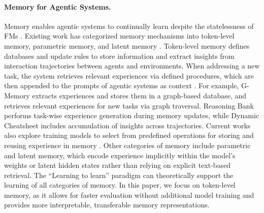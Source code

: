 \documentclass{article}
\theoremstyle{plain}
\theoremstyle{definition}
\theoremstyle{remark}
\newif\ifcomment
\newcommand{\shc}[1]{\textcolor{violet}{\ifcomment(SH Comment: #1)\else#1\fi}}
\begin{document}
\paragraph{Memory for Agentic Systems.} Memory enables agentic systems to continually learn despite the statelessness of FMs \citep{hu2025memory, Zhang2025Survey}. Existing work has categorized memory mechanisms into token-level memory, parametric memory, and latent memory \citep{hu2025memory}. Token-level memory defines databases and update rules to store information and extract insights from interaction trajectories between agents and environments. When addressing a new task, the system retrieves relevant experiences via defined procedures, which are then appended to the prompts of agentic systems as context \citep{chhikara2025mem0, rasmussen2025zep, nan2025nemori, zhang2025g, ouyang2025reasoningbank, suzgun2025DynamicCheatsheet, zhaoExpeL2024}. For example, G-Memory \citep{zhang2025g} extracts experiences and stores them in a graph-based database, and retrieves relevant experiences for new tasks via graph traversal. Reasoning Bank \citep{ouyang2025reasoningbank} performs task-wise experience generation during memory updates, while Dynamic Cheatsheet \citep{suzgun2025DynamicCheatsheet} includes accumulation of insights across trajectories. Current works also explore training models to select from predefined operations for storing and reusing experience in memory \citep{zhou2025memento, yan2025memory, liang2026learning, wang2025mem}. Other categories of memory include parametric and latent memory, which encode experience implicitly within the model's weights \citep{Zhen2024Speed, zhang2025agentlearningearlyexperience} or latent hidden states \citep{Yu2024MEMORYLLM, zhang2025memgen, zou2025latent} rather than relying on explicit text-based retrieval. The ``Learning to learn'' paradigm can theoretically support the learning of all categories of memory. In this paper, we focus on token-level memory, as it allows for faster evaluation without additional model training and provides more interpretable, transferable memory representations.
 
\end{document}
